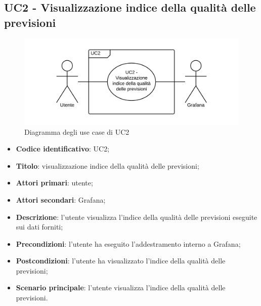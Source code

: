 \subsection{UC2 - Visualizzazione indice della qualità delle previsioni}
\begin{figure}[H]
\includegraphics{img/UC2_-_Visualizzazione_indice_della_qualit_delle_previsioni.png}
\caption{Diagramma degli use case di UC2}
\end{figure}
\begin{itemize}
	\item \textbf{Codice identificativo}: UC2;
	\item \textbf{Titolo}: visualizzazione indice della qualità delle previsioni;
	\item \textbf{Attori primari}: utente;
	\item \textbf{Attori secondari}: Grafana\glo;
	\item \textbf{Descrizione}: l'utente visualizza l'indice della qualità delle previsioni eseguite sui dati forniti;
	\item \textbf{Precondizioni}: l'utente ha eseguito l'addestramento interno a Grafana\glo;
	\item \textbf{Postcondizioni}: l'utente ha visualizzato l'indice della qualità delle previsioni;
	\item \textbf{Scenario principale}: l'utente visualizza l'indice della qualità delle previsioni.
\end{itemize}